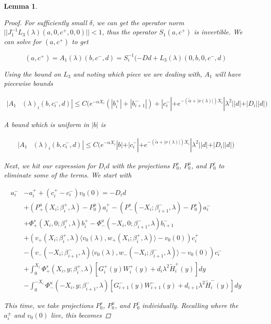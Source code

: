 \documentclass[12pt]{article}
\newtheorem{lemma}{Lemma}
\begin{document}
\begin{lemma}
\begin{proof}
For sufficiently small $\delta$, we can get the operator norm $||J_1^{-1} L_3(\lambda)(a, 0, c^+, 0, 0)|| < 1$, thus the operator $S_1(a, c^+)$ is invertible. We can solve for $(a, c^+)$ to get

\[
(a, c^+) = A_1(\lambda)(b, c^-, d) = S_i^{-1}(-D d + L_3(\lambda)(0, b, 0, c^-, d)
\]

Using the bound on $L_3$ and noting which piece we are dealing with, $A_1$ will have piecewise bounds

\begin{align*}
|A_1&(\lambda)_i(b, c_i^-, d)|
\leq C \Big( e^{-\alpha X_i} (|b_i^+| + |b_{i+1}^-|) + |c_i^-| + e^{-(\tilde{\alpha}+|\nu(\lambda)|) X_i} |\lambda^2| |d| + |D_i||d| \Big)
\end{align*} 

A bound which is uniform in $|b|$ is 

\begin{align*}
|A_1&(\lambda)_i(b, c_i^-, d)|
\leq C \Big( e^{-\alpha X_i} |b| + |c_i^-| + e^{-(\tilde{\alpha}+|\nu(\lambda)|) X_i} |\lambda^2| |d| + |D_i||d| \Big)
\end{align*} 

Next, we hit our expression for $D_i d$ with the projections $P^s_0$, $P^u_0$, and $P^c_0$ to eliminate some of the terms. We start with

\begin{align*}
a_i^- &- a_i^+ + (c_i^+ - c_i^-)v_0(0) = -D_i d  \\
&+ (P^u_+(X_i; \beta_i^+, \lambda) - P_0^u)a_i^+ - (P^s_-(-X_i; \beta_{i+1}^-,\lambda) - P_0^s)a_i^- \\
&+ \Phi^s_+(X_i, 0; \beta_i^+, \lambda)b_i^+ - \Phi^u_-(-X_i, 0; \beta_{i+1}^-, \lambda) b_{i+1}^- \\
&+ (v_+(X_i; \beta_i^+, \lambda) \langle v_0(\lambda), w_+(X_i; \beta_i^+, \lambda) \rangle - v_0(0) ) c_i^+ \\
&- (v_-(-X_i; \beta_{i+1}^-, \lambda) \langle v_0(\lambda), w_-(-X_i; \beta_{i+1}^-, \lambda) \rangle - v_0(0) ) c_i^- \\
&+ \int_0^{X_i} \Phi^s_+(X_i, y; \beta_i^+, \lambda) [ G_i^+(y) W_i^+(y) + d_i \lambda^2 \tilde{H}_i^+(y) ] dy \\
&- \int_0^{-X_i} \Phi^u_-(-X_i, y; \beta_{i+1}^-, \lambda) [ G_{i+1}^-(y) W_{i+1}^-(y) + d_{i+1} \lambda^2 \tilde{H}_i^-(y) ] dy
\end{align*}

This time, we take projections $P^s_0$, $P^u_0$, and $P^c_0$ individually. Recalling where the $a_i^\pm$ and $v_0(0)$ live, this becomes 


\end{proof}
\end{lemma}
\end{document}

